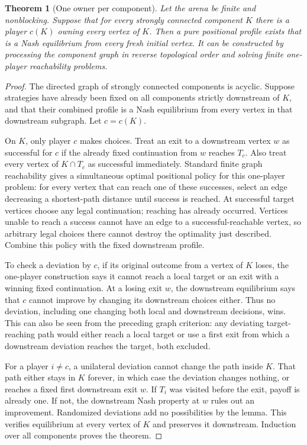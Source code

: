 \documentclass[11pt]{article}
\newtheorem{theorem}{Theorem}
\theoremstyle{definition}
\theoremstyle{remark}
\begin{document}
\begin{theorem}[One owner per component]
Let the arena be finite and nonblocking. Suppose that for every strongly connected component $K$ there is a player $c(K)$ owning every vertex of $K$. Then a pure positional profile exists that is a Nash equilibrium from every fresh initial vertex. It can be constructed by processing the component graph in reverse topological order and solving finite one-player reachability problems.
\end{theorem}
\begin{proof}
The directed graph of strongly connected components is acyclic. Suppose strategies have already been fixed on all components strictly downstream of $K$, and that their combined profile is a Nash equilibrium from every vertex in that downstream subgraph. Let $c=c(K)$.

On $K$, only player $c$ makes choices. Treat an exit to a downstream vertex $w$ as successful for $c$ if the already fixed continuation from $w$ reaches $T_c$. Also treat every vertex of $K\cap T_c$ as successful immediately. Standard finite graph reachability gives a simultaneous optimal positional policy for this one-player problem: for every vertex that can reach one of these successes, select an edge decreasing a shortest-path distance until success is reached. At successful target vertices choose any legal continuation; reaching has already occurred. Vertices unable to reach a success cannot have an edge to a successful-reachable vertex, so arbitrary legal choices there cannot destroy the optimality just described. Combine this policy with the fixed downstream profile.

To check a deviation by $c$, if its original outcome from a vertex of $K$ loses, the one-player construction says it cannot reach a local target or an exit with a winning fixed continuation. At a losing exit $w$, the downstream equilibrium says that $c$ cannot improve by changing its downstream choices either. Thus no deviation, including one changing both local and downstream decisions, wins. This can also be seen from the preceding graph criterion: any deviating target-reaching path would either reach a local target or use a first exit from which a downstream deviation reaches the target, both excluded.

For a player $i\neq c$, a unilateral deviation cannot change the path inside $K$. That path either stays in $K$ forever, in which case the deviation changes nothing, or reaches a fixed first downstream exit $w$. If $T_i$ was visited before the exit, payoff is already one. If not, the downstream Nash property at $w$ rules out an improvement. Randomized deviations add no possibilities by the lemma. This verifies equilibrium at every vertex of $K$ and preserves it downstream. Induction over all components proves the theorem.
\end{proof}
\end{document}

